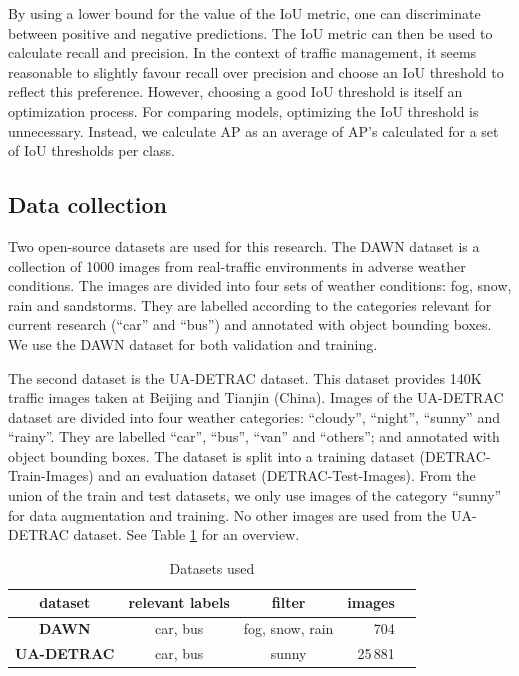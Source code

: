 \documentclass[]{article}
\begin{document}
	By using a lower bound for the value of the IoU metric, one can discriminate between positive and negative predictions. The IoU metric can then be used to calculate recall and precision. In the context of traffic management, it seems reasonable to slightly favour recall over precision and choose an IoU threshold to reflect this preference. However, choosing a good IoU threshold is itself an optimization process. For comparing models, optimizing the IoU threshold is unnecessary. Instead, we calculate AP as an average of AP's calculated for a set of IoU thresholds per class.

\subsection{Data collection}

	Two open-source datasets are used for this research. The DAWN dataset \cite{bw1x-yh39-20} is a collection of 1000 images from real-traffic environments in adverse weather conditions. The images are divided into four sets of weather conditions: fog, snow, rain and sandstorms. They are labelled according to the categories relevant for current research (``car'' and ``bus'') and annotated with object bounding boxes. We use the DAWN dataset for both validation and training.
	
	The second dataset is the UA-DETRAC \cite{CVIU_UA-DETRAC} dataset. This dataset provides 140K traffic images taken at Beijing and Tianjin (China). Images of the UA-DETRAC dataset are divided into four weather categories: ``cloudy'', ``night'', ``sunny'' and ``rainy''. They are labelled ``car'', ``bus'', ``van'' and ``others''; and annotated with object bounding boxes. The dataset is split into a training dataset (DETRAC-Train-Images) and an evaluation dataset (DETRAC-Test-Images).   From the union of the train and test datasets, we only use images of the category ``sunny'' for data augmentation and training. No other images are used from the UA-DETRAC dataset. See Table \ref{table:datasets} for an overview.
	
	\begin{table}[H]
		\centering
		\begin{tabular}{cccrp{1.5in}}
			\toprule
			\textbf{dataset} & \textbf{relevant labels} & \textbf{filter} & \textbf{images} \\
			\midrule
			\textbf{DAWN} & car, bus & fog, snow, rain & 704  \\
			\textbf{UA-DETRAC} & car, bus & sunny &  25\,881 \\
			\bottomrule
		\end{tabular}
		\caption{Datasets used}
		\label{table:datasets}
	\end{table}
\end{document}

